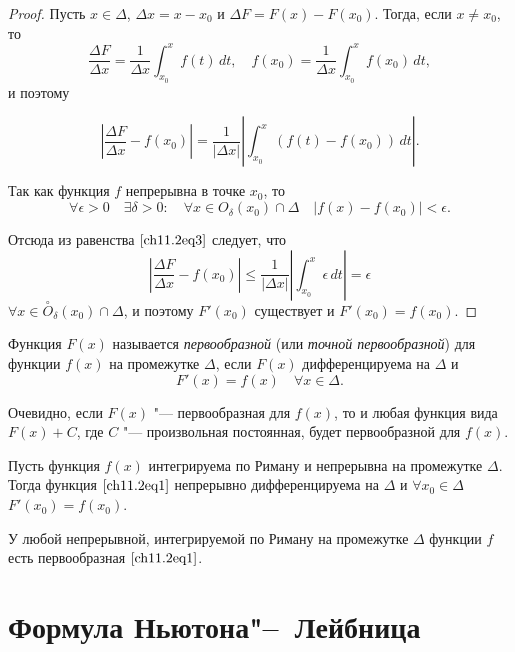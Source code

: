\begin{proof}
Пусть $x \in \Delta$, $\Delta x = x - x_0$ и $\Delta F = F(x) - F(x_0)$. Тогда, если $x \not= x_0$, то 
$$ 
\frac{\Delta F}{\Delta x} = \frac{1}{\Delta x} \int_{x_0}^{x} f(t) \,dt, \quad f(x_0) = \frac{1}{\Delta x} \int_{x_0}^{x} f(x_0) \,dt,
$$
и поэтому 

\begin{equation} \label{ch11.2eq3}
\left| \frac{\Delta F}{\Delta x} - f(x_0) \right| = \frac{1}{|\Delta x|} \left| \int_{x_0}^{x} \left( f(t) - f(x_0) \right) \,dt \right|.
\end{equation}

Так как функция $f$ непрерывна в точке $x_0$, то
$$
\forall \epsilon > 0 \quad \exists \delta > 0 : \quad \forall x \in O_\delta(x_0) \cap \Delta \quad |f(x) - f(x_0)| < \epsilon.
$$

Отсюда из равенства $\eqref{ch11.2eq3}$ следует, что 
$$
\left| \frac{\Delta F}{\Delta x} - f(x_0) \right| \le \frac{1}{|\Delta x|} \left| \int_{x_0}^{x} \epsilon \,dt\right| = \epsilon
$$
$\forall x \in \overset{\circ}{O}_\delta(x_0) \cap \Delta$, и поэтому $F'(x_0)$  существует и $F'(x_0) = f(x_0).$
\end{proof}

\begin{defn}
Функция $F(x)$ называется \textit{первообразной} (или \textit{точной первообразной}) для функции $f(x)$ на промежутке  $\Delta$, если $F(x)$ дифференцируема на $\Delta$ и
$$
F'(x) = f(x) \quad \forall x \in \Delta.
$$

Очевидно, если $F(x)$ "--- первообразная для $f(x)$, то и любая функция вида $F(x) + C$,  где $C$ "--- произвольная постоянная, будет первообразной для $f(x)$. 
\end{defn}

\begin{cons}
Пусть функция $f(x)$ интегрируема по Риману и непрерывна на промежутке $\Delta$. Тогда функция $\eqref{ch11.2eq1}$ непрерывно дифференцируема на $\Delta$ и $\forall x_0 \in \Delta$ $F'(x_0) = f(x_0)$. 
\end{cons}
У  любой непрерывной, интегрируемой по Риману на промежутке $\Delta$ функции $f$ есть первообразная $\eqref{ch11.2eq1}$.

\section[Формула Ньютона"--~Лейбница]{Формула Ньютона"--~Лейбница}

